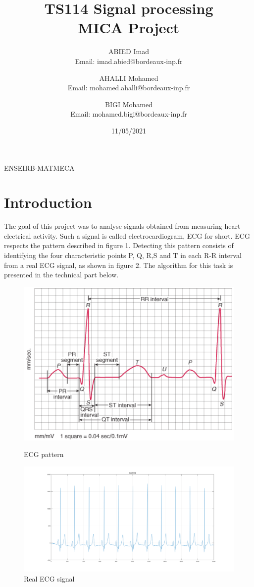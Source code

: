 \documentclass{article}
\title{TS114 Signal processing \\ MICA Project}
\author{ABIED Imad \\ Email: imad.abied@bordeaux-inp.fr

\and AHALLI Mohamed \\ Email: mohamed.ahalli@bordeaux-inp.fr

\and BIGI Mohamed \\ Email:  mohamed.bigi@bordeaux-inp.fr }
\date{11/05/2021}
\begin{document}
\maketitle
\begin{center}
    ENSEIRB-MATMECA
\end{center}

\tableofcontents

\newpage

\section{Introduction}

The goal of this project was to analyse signals obtained from measuring heart electrical activity. Such a signal is called electrocardiogram, ECG for short.
ECG respects the pattern described in figure 1. Detecting this pattern consists of identifying the four characteristic points P, Q, R,S and T in each R-R interval from a real ECG signal, as shown in figure 2. The algorithm for this task is presented in the technical part below.

\begin{figure}[htbp]

\centerline{\includegraphics[scale = 0.5]{figure_1.png}}
\caption{ECG pattern}

\centerline{\includegraphics[scale = 0.3]{figure_2.png}}
\caption{Real ECG signal}

\end{figure}
\end{document}
